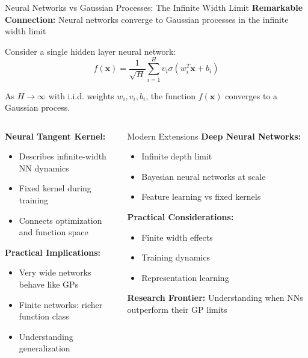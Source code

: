 \documentclass[aspectratio=169,11pt]{beamer}
\newcommand{\bx}{\mathbf{x}}
\begin{document}
\begin{frame}{Neural Networks vs Gaussian Processes: The Infinite Width Limit}
\textbf{Remarkable Connection:} Neural networks converge to Gaussian processes in the infinite width limit

\begin{theorem}[Neal, 1996]
Consider a single hidden layer neural network:
\[f(\bx) = \frac{1}{\sqrt{H}} \sum_{i=1}^H v_i \sigma(w_i^T \bx + b_i)\]

As $H \to \infty$ with i.i.d. weights $w_i, v_i, b_i$, the function $f(\bx)$ converges to a Gaussian process.
\end{theorem}

\begin{columns}
\begin{column}{0.5\textwidth}
\textbf{Neural Tangent Kernel:}
\begin{itemize}
\item Describes infinite-width NN dynamics
\item Fixed kernel during training
\item Connects optimization and function space
\end{itemize}

\textbf{Practical Implications:}
\begin{itemize}
\item Very wide networks behave like GPs
\item Finite networks: richer function class
\item Understanding generalization
\end{itemize}
\end{column}
\begin{column}{0.5\textwidth}
\begin{block}{Modern Extensions}
\textbf{Deep Neural Networks:}
\begin{itemize}
\item Infinite depth limit
\item Bayesian neural networks at scale
\item Feature learning vs fixed kernels
\end{itemize}

\textbf{Practical Considerations:}
\begin{itemize}
\item Finite width effects
\item Training dynamics
\item Representation learning
\end{itemize}
\end{block}

\textbf{Research Frontier:} Understanding when NNs outperform their GP limits
\end{column}
\end{columns}
\end{frame}
\end{document}
